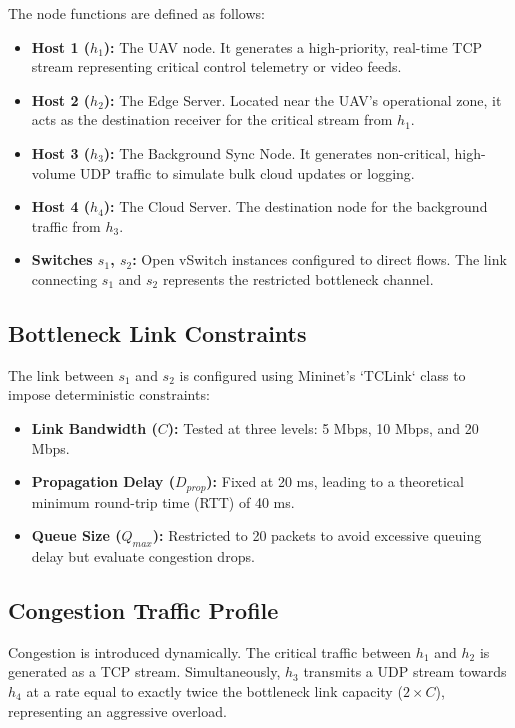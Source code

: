 \documentclass[conference]{IEEEtran}
\begin{document}
The node functions are defined as follows:
\begin{itemize}
    \item \textbf{Host 1 ($h_1$):} The UAV node. It generates a high-priority, real-time TCP stream representing critical control telemetry or video feeds.
    \item \textbf{Host 2 ($h_2$):} The Edge Server. Located near the UAV's operational zone, it acts as the destination receiver for the critical stream from $h_1$.
    \item \textbf{Host 3 ($h_3$):} The Background Sync Node. It generates non-critical, high-volume UDP traffic to simulate bulk cloud updates or logging.
    \item \textbf{Host 4 ($h_4$):} The Cloud Server. The destination node for the background traffic from $h_3$.
    \item \textbf{Switches $s_1$, $s_2$:} Open vSwitch instances configured to direct flows. The link connecting $s_1$ and $s_2$ represents the restricted bottleneck channel.
\end{itemize}

\subsection{Bottleneck Link Constraints}
The link between $s_1$ and $s_2$ is configured using Mininet's `TCLink` class to impose deterministic constraints:
\begin{itemize}
    \item \textbf{Link Bandwidth ($C$):} Tested at three levels: 5 Mbps, 10 Mbps, and 20 Mbps.
    \item \textbf{Propagation Delay ($D_{prop}$):} Fixed at 20 ms, leading to a theoretical minimum round-trip time (RTT) of 40 ms.
    \item \textbf{Queue Size ($Q_{max}$):} Restricted to 20 packets to avoid excessive queuing delay but evaluate congestion drops.
\end{itemize}

\subsection{Congestion Traffic Profile}
Congestion is introduced dynamically. The critical traffic between $h_1$ and $h_2$ is generated as a TCP stream. Simultaneously, $h_3$ transmits a UDP stream towards $h_4$ at a rate equal to exactly twice the bottleneck link capacity ($2 \times C$), representing an aggressive overload.
\end{document}
